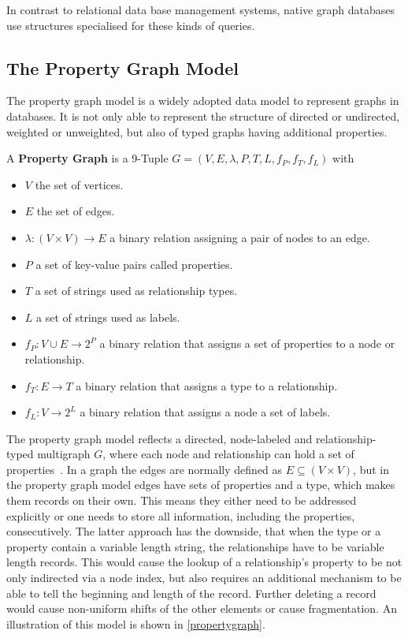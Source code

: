     In contrast to relational data base management systems, native graph databases use structures specialised for these kinds of queries.
            
    \subsection{The Property Graph Model}\label{prop-graph-model}
        The property graph model is a widely adopted data model to represent graphs in databases.
        It is not only able to represent the structure of directed or undirected, weighted or unweighted, but also of typed graphs having additional properties.

        A \textbf{Property Graph} is a 9-Tuple $G = (V, E, \lambda, P, T, L, f_P, f_T, f_L)$ with 
        \begin{itemize}
            \item $V$ the set of vertices.
            \item $E$ the set of edges.
            \item $\lambda: (V \times V) \rightarrow E$ a binary relation assigning a pair of nodes to an edge.
            \item $P$ a set of key-value pairs called properties.
            \item $T$ a set of strings used as relationship types.
            \item $L$ a set of strings used as labels.
            \item $f_P: V \cup E \rightarrow 2^P$ a binary relation that assigns a set of properties to a node or relationship.
            \item $f_T: E \rightarrow T$ a binary relation that assigns a type to a relationship.
            \item  $f_L: V \rightarrow 2^L$ a binary relation that assigns a node a set of labels.
        \end{itemize} 
        \smallskip
        The property graph model reflects a directed, node-labeled and relationship-typed multigraph $G$, where each node and relationship can hold a set of properties~\cite{angles2018property, rodriguez2012graph}.
        In a graph the edges are normally defined as $E \subseteq (V \times V)$, but in the property graph model edges have sets of properties and a type, which makes them records on their own. 
        This means they either need to be addressed explicitly or one needs to store all information, including the properties, consecutively. 
        The latter approach has the downside, that when the type or a property contain a variable length string, the relationships have to be variable length records. 
        This would cause the lookup of a relationship's property to be not only indirected via a node index, but also requires an additional mechanism to be able to tell the beginning and length of the record. 
        Further deleting a record would cause non-uniform shifts of the other elements or cause fragmentation.
        An illustration of this model is shown in \ref{propertygraph}.
        
